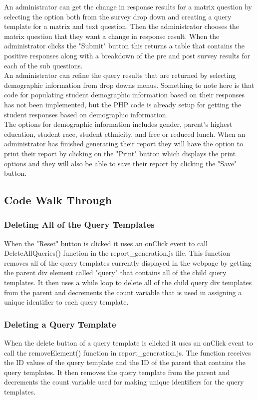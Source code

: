 \documentclass[../final.tex]{subfiles}
\begin{document}
	  An administrator can get the change in response results for a matrix question by selecting the option both from the survey drop down and creating a query template for a matrix and text question. Then the administrator chooses the matrix question that they want a change in response result. When the administrator clicks the "Submit" button this returns a table that contains the positive responses along with a breakdown of the pre and post survey results for each of the sub questions.\\
	  An administrator can refine the query results that are returned by selecting demographic information from drop downs menus. Something to note here is that code for populating student demographic information based on their responses has not been implemented, but the PHP code is already setup for getting the student responses based on demographic information.\\
	   The options for demographic information includes gender, parent's highest education, student race, student ethnicity, and free or reduced lunch. When an administrator has finished generating their report they will have the option to print their report by clicking on the "Print" button which displays the print options and they will also be able to save their report by clicking the "Save" button.
	\subsection{Code Walk Through}
	\subsubsection{Deleting All of the Query Templates}
	When the "Reset" button is clicked it uses an onClick event to call DeleteAllQueries() function in the report\_generation.js file. This function removes all of the query templates currently displayed in the webpage by getting the parent div element called "query" that contains all of the child query templates. It then uses a while loop to delete all of the child query div templates from the parent and decrements the count variable that is used in assigning a unique identifier to each query template.
	\subsubsection{Deleting a Query Template}
	When the delete button of a query template is clicked it uses an onClick event to call the removeElement() function in report\_generation.js. The function receives the ID values of the query template and the ID of the parent that contains the query templates. It then removes the query template from the parent and decrements the count variable used for making unique identifiers for the query templates.  
\end{document}
